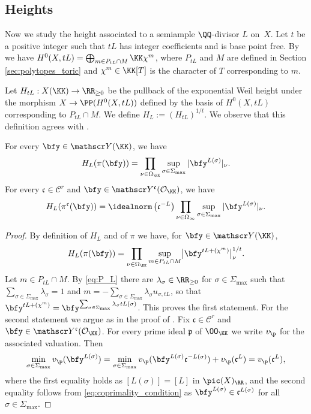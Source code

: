 \subsection{Heights}
\label{sec:heights}
Now we study the height associated to a semiample $\QQ$-divisor $L$ on~$X$.
Let $t$ be a positive integer such that $tL$ has integer coefficients and is base point free.
By \cite[Prop.\,4.3.3]{MR2810322} we have
$H^0(X, tL)=\bigoplus_{m\in P_{tL}\cap M}\KK\chi^m$, where $P_{tL}$ and $M$
are defined in Section \ref{sec:polytopes_toric} and $\chi^m\in \KK[T]$ is
the character of $T$ corresponding to $m$.

Let $H_{tL}:X(\KK)\to\RR_{\geq0}$ be the pullback of the exponential Weil height under
the morphism $X\to\PP(H^0(X,tL))$ defined by the basis of $H^0(X,tL)$ corresponding
to $P_{tL}\cap M$.
We define $H_{L}:=(H_{tL})^{1/t}$.
We observe that this definition agrees with \cite[\S 2.1]{MR1369408}.
\begin{prop}
\label{prop:height}
For every $\bfy \in \mathscr Y({\KK})$, we have
\[
H_L(\pi(\bfy))
=\prod_{\nu\in\Omega_{\KK}} \sup_{\sigma\in\Sigma_{\max}} |\bfy^{L(\sigma)}|_{\nu}.
\]
For every $\mathfrak c\in\mathcal{C}^{r}$ and
$\bfy\in \mathscr Y^{\mathfrak c}(\mathcal{O}_{\KK})$, we have
\[
H_L(\pi^{\mathfrak c}(\bfy))
=\idealnorm \left(\mathfrak c^{-L}\right)
\prod_{\nu\in\Omega_\infty} \sup_{\sigma\in\Sigma_{\max}} | \bfy^{L(\sigma)}|_{\nu}.
\]
\end{prop}
\begin{proof}
By definition of $H_L$ and of $\pi$ we have, for $\bfy \in \mathscr Y({\KK})$,
\[
H_L(\pi(\bfy))
=\prod_{\nu\in\Omega_{\KK}} \sup_{m\in P_{tL}\cap M} \bigl| \bfy^{tL+(\chi^m)} \bigr|_{\nu}^{1/t}.
\]
Let $m\in P_{tL}\cap M$.
By \eqref{eq:P_L} there are $\lambda_\sigma\in\RR_{\geq0}$ for
$\sigma\in\Sigma_{\max}$ such that
$\sum_{\sigma\in\Sigma_{\max}}\lambda_\sigma=1$
and $m=-\sum_{\sigma\in \Sigma_{\max}}\lambda_\sigma u_{\sigma,tL}$, so that
$\bfy^{tL+(\chi^m)}= \bfy^{\sum_{\sigma\in \Sigma_{\max}}\lambda_\sigma tL(\sigma)}$.
This proves the first statement.
For the second statement we argue as in the proof of \cite[Prop.\,2]{MR3514738}.
Fix $\mathfrak c\in\mathcal{C}^{r}$ and
$\bfy\in \mathscr Y^{\mathfrak c}(\mathcal{O}_{\KK})$.
For every prime ideal $\mathfrak p$ of $\OO_{\KK}$ we write $v_\p$ for the
associated valuation. Then
\[
\min_{\sigma\in\Sigma_{\max}} v_\p(\bfy^{L(\sigma)})
=\min_{\sigma\in\Sigma_{\max}} v_\p(\bfy^{L(\sigma)}\mathfrak c^{-L(\sigma)})
+ v_\p(\mathfrak c^L)=v_\p(\mathfrak c^L),
\]
where the first equality holds as $[L(\sigma)]=[L]$ in $\pic(X)_{\RR}$, and the second equality
follows from \eqref{eq:coprimality_condition} as
$\bfy^{L(\sigma)} \in \mathfrak c^{L(\sigma)}$ for all $\sigma\in\Sigma_{\max}$.
\end{proof}

